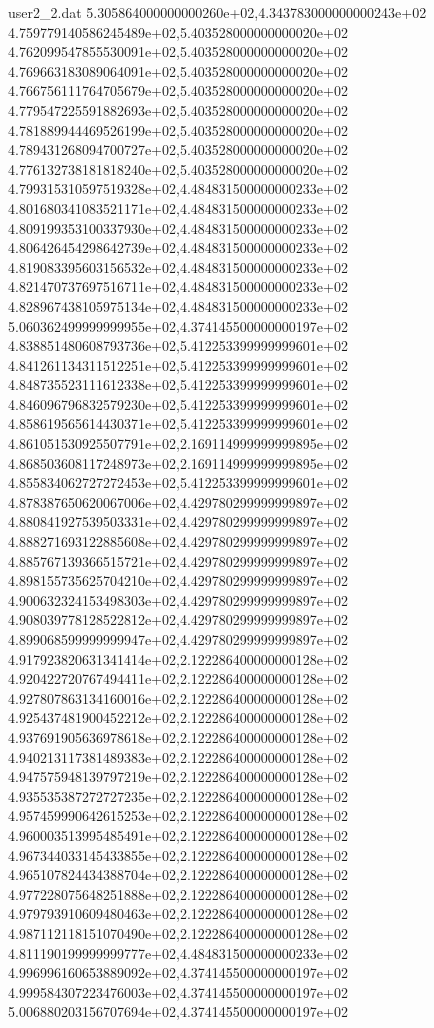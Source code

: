 \begin{filecontents}{user2_2.dat}
5.305864000000000260e+02,4.343783000000000243e+02
4.759779140586245489e+02,5.403528000000000020e+02
4.762099547855530091e+02,5.403528000000000020e+02
4.769663183089064091e+02,5.403528000000000020e+02
4.766756111764705679e+02,5.403528000000000020e+02
4.779547225591882693e+02,5.403528000000000020e+02
4.781889944469526199e+02,5.403528000000000020e+02
4.789431268094700727e+02,5.403528000000000020e+02
4.776132738181818240e+02,5.403528000000000020e+02
4.799315310597519328e+02,4.484831500000000233e+02
4.801680341083521171e+02,4.484831500000000233e+02
4.809199353100337930e+02,4.484831500000000233e+02
4.806426454298642739e+02,4.484831500000000233e+02
4.819083395603156532e+02,4.484831500000000233e+02
4.821470737697516711e+02,4.484831500000000233e+02
4.828967438105975134e+02,4.484831500000000233e+02
5.060362499999999955e+02,4.374145500000000197e+02
4.838851480608793736e+02,5.412253399999999601e+02
4.841261134311512251e+02,5.412253399999999601e+02
4.848735523111612338e+02,5.412253399999999601e+02
4.846096796832579230e+02,5.412253399999999601e+02
4.858619565614430371e+02,5.412253399999999601e+02
4.861051530925507791e+02,2.169114999999999895e+02
4.868503608117248973e+02,2.169114999999999895e+02
4.855834062727272453e+02,5.412253399999999601e+02
4.878387650620067006e+02,4.429780299999999897e+02
4.880841927539503331e+02,4.429780299999999897e+02
4.888271693122885608e+02,4.429780299999999897e+02
4.885767139366515721e+02,4.429780299999999897e+02
4.898155735625704210e+02,4.429780299999999897e+02
4.900632324153498303e+02,4.429780299999999897e+02
4.908039778128522812e+02,4.429780299999999897e+02
4.899068599999999947e+02,4.429780299999999897e+02
4.917923820631341414e+02,2.122286400000000128e+02
4.920422720767494411e+02,2.122286400000000128e+02
4.927807863134160016e+02,2.122286400000000128e+02
4.925437481900452212e+02,2.122286400000000128e+02
4.937691905636978618e+02,2.122286400000000128e+02
4.940213117381489383e+02,2.122286400000000128e+02
4.947575948139797219e+02,2.122286400000000128e+02
4.935535387272727235e+02,2.122286400000000128e+02
4.957459990642615253e+02,2.122286400000000128e+02
4.960003513995485491e+02,2.122286400000000128e+02
4.967344033145433855e+02,2.122286400000000128e+02
4.965107824434388704e+02,2.122286400000000128e+02
4.977228075648251888e+02,2.122286400000000128e+02
4.979793910609480463e+02,2.122286400000000128e+02
4.987112118151070490e+02,2.122286400000000128e+02
4.811190199999999777e+02,4.484831500000000233e+02
4.996996160653889092e+02,4.374145500000000197e+02
4.999584307223476003e+02,4.374145500000000197e+02
5.006880203156707694e+02,4.374145500000000197e+02

\end{filecontents}
